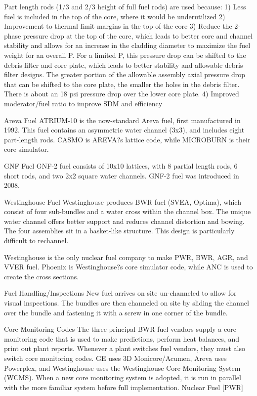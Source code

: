 \documentclass[10pt]{article}
\begin{document}
Part length rods (1/3 and 2/3 height of full fuel rods) are used because:
1)	Less fuel is included in the top of the core, where it would be underutilized
2)	Improvement to thermal limit margins in the top of the core
3)	Reduce the 2-phase pressure drop at the top of the core, which leads to better core and channel stability and allows for an increase in the cladding diameter to maximize the fuel weight for an overall P. For a limited P, this pressure drop can be shifted to the debris filter and core plate, which leads to better stability and allowable debris filter designs. The greater portion of the allowable assembly axial pressure drop that can be shifted to the core plate, the smaller the holes in the debris filter. There is about an 18 psi pressure drop over the lower core plate. 
4)	Improved moderator/fuel ratio to improve SDM and efficiency

Areva Fuel
ATRIUM-10 is the now-standard Areva fuel, first manufactured in 1992. This fuel contains an asymmetric water channel (3x3), and includes eight part-length rods. CASMO is AREVA?s lattice code, while MICROBURN is their core simulator. 

GNF Fuel
GNF-2 fuel consists of 10x10 lattices, with 8 partial length rods, 6 short rods, and two 2x2 square water channels. GNF-2 fuel was introduced in 2008. 

Westinghouse Fuel
Westinghouse produces BWR fuel (SVEA, Optima), which consist of four sub-bundles and a water cross within the channel box. The unique water channel offers better support and reduces channel distortion and bowing. The four assemblies sit in a basket-like structure. This design is particularly difficult to rechannel. 

Westinghouse is the only nuclear fuel company to make PWR, BWR, AGR, and VVER fuel. Phoenix is Westinghouse?s core simulator code, while ANC is used to create the cross sections. 

Fuel Handling/Inspections
New fuel arrives on site un-channeled to allow for visual inspections. The bundles are then channeled on site by sliding the channel over the bundle and fastening it with a screw in one corner of the bundle. 

Core Monitoring Codes
The three principal BWR fuel vendors supply a core monitoring code that is used to make predictions, perform heat balances, and print out plant reports. Whenever a plant switches fuel vendors, they must also switch core monitoring codes. GE uses 3D Monicore/Acumen, Areva uses Powerplex, and Westinghouse uses the Westinghouse Core Monitoring System (WCMS). When a new core monitoring system is adopted, it is run in parallel with the more familiar system before full implementation. 
Nuclear Fuel [PWR]
\end{document}

